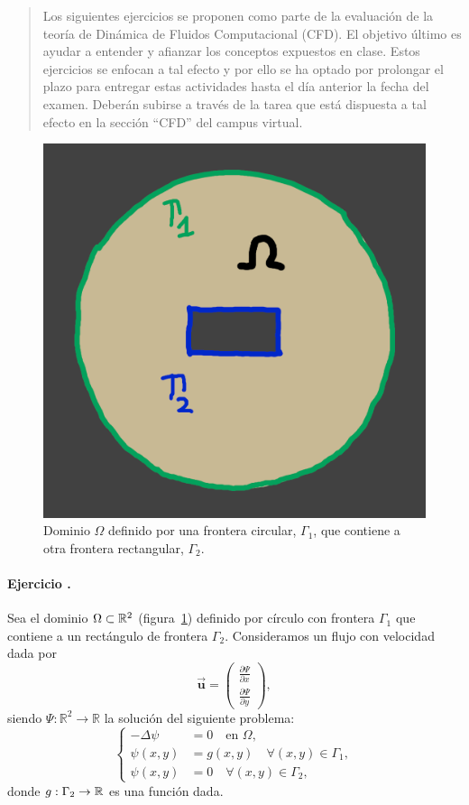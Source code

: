 \documentclass[11pt]{article}
\title{\cabecera}
\author{}
\date{}
\newcounter{actividad}
\newcommand{\actividad}[1]{
\stepcounter{actividad}
\paragraph*{Ejercicio \theactividad. #1}
}
\newcommand{\Vector}[1]{\ensuremath{\vec{\mathbf{#1}}}}
\renewcommand{\uu}{\Vector{u}}
\begin{document}
\maketitle

\begin{quotation}\small
Los siguientes ejercicios se proponen como parte de la evaluación de
la teoría de Dinámica de Fluidos Computacional (CFD).  El objetivo
último es ayudar a entender y afianzar los conceptos expuestos en
clase. Estos ejercicios se enfocan a tal efecto y por ello se ha
optado por prolongar el plazo para entregar estas actividades hasta
el día anterior la fecha del examen.  Deberán subirse a través de
la tarea que está dispuesta a tal efecto en la sección ``CFD'' del
campus virtual.
\end{quotation}

\begin{figure}
\centering
\includegraphics[width=0.25\linewidth]{dominio-circ-rect}
\caption{Dominio $\Omega$ definido por una frontera circular,
    $\Gamma_1$, que contiene a otra frontera rectangular, $\Gamma_2$.}
\label{dominio1}
\end{figure}

\actividad{} Sea el dominio $\Omega\subset{\mathbb R}^2$
(figura~\ref{dominio1}) definido por círculo con frontera
$\Gamma_1$ que contiene a un rectángulo de frontera
$\Gamma_2$. Consideramos un flujo con velocidad dada por
$$
\uu=\begin{pmatrix}
\frac{\partial\Psi}{\partial x}
\\[0.5em]
\frac{\partial\Psi}{\partial y}
\end{pmatrix},
$$
siendo $\Psi:\mathbb R^2 \to \mathbb R$ la solución del siguiente problema:
\begin{equation}
\begin{cases}
-\Delta\psi &=0 \quad\text{en } \Omega,
\\
\psi(x,y)&=g(x,y) \quad\forall (x,y)\in\Gamma_1,
\\
\psi(x,y)&=0 \quad\forall (x,y)\in\Gamma_2,
\end{cases}
\label{eq:psi.dirichlet}
\end{equation}
donde  $g:\Gamma_2\to{\mathbb R}$ es una función dada.
\end{document}
